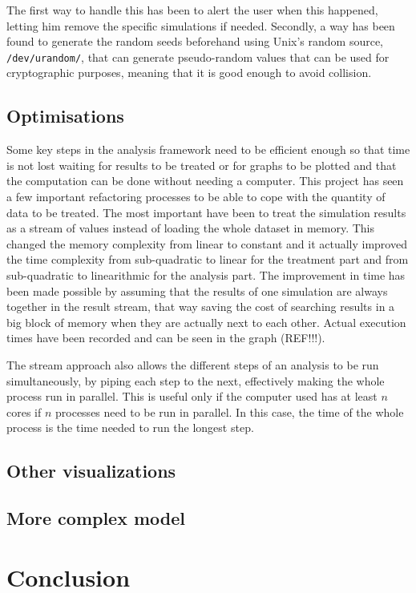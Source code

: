 \documentclass[a4paper,12pt]{report}
\begin{document}
The first way to handle this has been to alert the user when this happened, letting him remove the specific simulations if needed. Secondly, a way has been found to generate the random seeds beforehand using Unix's random source, \texttt{/dev/urandom/}, that can generate pseudo-random values that can be used for cryptographic purposes, meaning that it is good enough to avoid collision.

\section{Optimisations}
Some key steps in the analysis framework need to be efficient enough so that time is not lost waiting for results to be treated or for graphs to be plotted and that the computation can be done without needing a computer.
This project has seen a few important refactoring processes to be able to cope with the quantity of data to be treated. The most important have been to treat the simulation results as a stream of values instead of loading the whole dataset in memory. This changed the memory complexity from linear to constant and it actually improved the time complexity from sub-quadratic to linear for the treatment part and from sub-quadratic to linearithmic for the analysis part. The improvement in time has been made possible by assuming that the results of one simulation are always together in the result stream, that way saving the cost of searching results in a big block of memory when they are actually next to each other.
Actual execution times have been recorded and can be seen in the graph (REF!!!).\

The stream approach also allows the different steps of an analysis to be run simultaneously, by piping each step to the next, effectively making the whole process run in parallel. This is useful only if the computer used has at least $n$ cores if $n$ processes need to be run in parallel. In this case, the time of the whole process is the time needed to run the longest step.


\section{Other visualizations}
\section{More complex model}


\chapter*{Conclusion}
\end{document}
